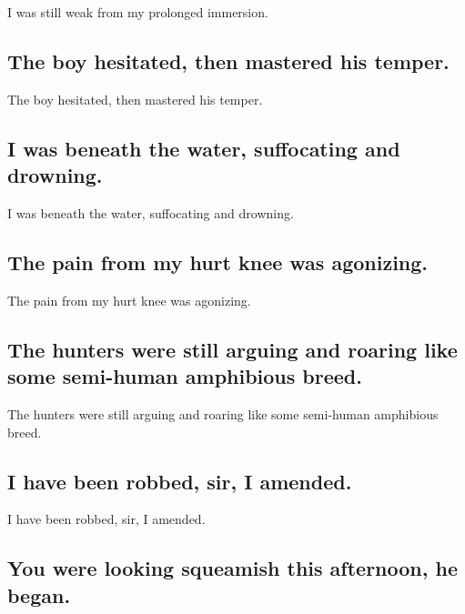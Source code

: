 \documentclass[]{article}
\begin{document}
I was still weak from my prolonged immersion.

\hypertarget{the-boy-hesitated-then-mastered-his-temper.}{%
\subsection{The boy hesitated, then mastered his
temper.}\label{the-boy-hesitated-then-mastered-his-temper.}}

The boy hesitated, then mastered his temper.

\hypertarget{i-was-beneath-the-water-suffocating-and-drowning.}{%
\subsection{I was beneath the water, suffocating and
drowning.}\label{i-was-beneath-the-water-suffocating-and-drowning.}}

I was beneath the water, suffocating and drowning.

\hypertarget{the-pain-from-my-hurt-knee-was-agonizing.}{%
\subsection{The pain from my hurt knee was
agonizing.}\label{the-pain-from-my-hurt-knee-was-agonizing.}}

The pain from my hurt knee was agonizing.

\hypertarget{the-hunters-were-still-arguing-and-roaring-like-some-semi-human-amphibious-breed.}{%
\subsection{The hunters were still arguing and roaring like some
semi-human amphibious
breed.}\label{the-hunters-were-still-arguing-and-roaring-like-some-semi-human-amphibious-breed.}}

The hunters were still arguing and roaring like some semi-human
amphibious breed.

\hypertarget{i-have-been-robbed-sir-i-amended.}{%
\subsection{I have been robbed, sir, I
amended.}\label{i-have-been-robbed-sir-i-amended.}}

I have been robbed, sir, I amended.

\hypertarget{you-were-looking-squeamish-this-afternoon-he-began.}{%
\subsection{You were looking squeamish this afternoon, he
began.}\label{you-were-looking-squeamish-this-afternoon-he-began.}}
\end{document}

